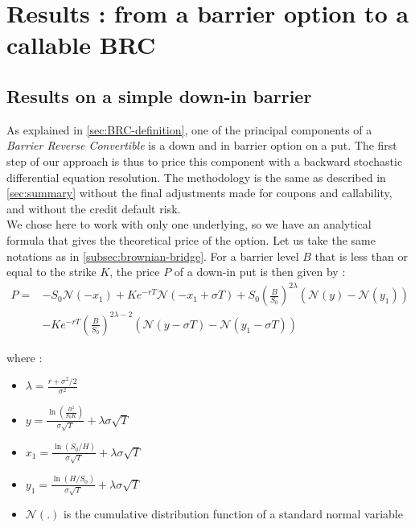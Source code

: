 \documentclass[a4paper,11pt,english]{book}
\begin{document}

\chapter{Results : from a barrier option to a callable BRC}

\section{Results on a simple down-in barrier}
As explained in \ref{sec:BRC-definition}, one of the principal components of a \textit{Barrier Reverse Convertible} is a down and in barrier option on a put. The first step of our approach is thus to price this component with a backward stochastic differential equation resolution. The methodology is the same as described in \ref{sec:summary} without the final adjustments made for coupons and callability, and without the credit default risk.\\

We chose here to work with only one underlying, so we have an analytical formula that gives the theoretical price of the option. Let us take the same notations as in \ref{subsec:brownian-bridge}. For a barrier level $B$ that is less than or equal to the strike $K$, the price $P$ of a down-in put is then given by \cite{hull2016options}: 
$$\begin{aligned}
P =& -S_{0}\mathcal{N}(-x_{1})+Ke^{-rT}\mathcal{N}(-x_{1}+\sigma T)+S_{0}(\frac{B}{S_{0}})^{2\lambda}(\mathcal{N}(y)-\mathcal{N}(y_{1})) \\
&-Ke^{-rT}(\frac{B}{S_{0}})^{2\lambda-2}(\mathcal{N}(y-\sigma T)-\mathcal{N}(y_{1}-\sigma T))
\end{aligned}$$

where :
\begin{itemize}
    \item $\lambda=\frac{r+\sigma^{2}/2}{\sigma^{2}}$
    \item $y=\frac{\ln(\frac{B^{2}}{S_{0}K})}{\sigma \sqrt{T}}+\lambda \sigma \sqrt{T}$
    \item $x_{1}=\frac{\ln(S_{0}/H)}{\sigma \sqrt{T}}+\lambda \sigma \sqrt{T}$
    \item $y_{1}=\frac{\ln(H/S_{0})}{\sigma \sqrt{T}}+\lambda \sigma \sqrt{T}$
    \item $\mathcal{N}(.)$ is the cumulative distribution function of a standard normal variable
\end{itemize}
\end{document}
